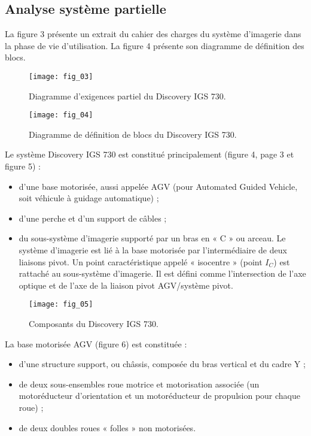 \subsection{Analyse système partielle}
La figure 3 présente un extrait du cahier des charges du système d’imagerie dans la phase de vie
d’utilisation. La figure 4 présente son diagramme de définition des blocs.


\begin{figure}[!h]
\centering
\texttt{[image: fig\_03]}
\caption{\label{fig:03}  Diagramme d’exigences partiel du Discovery IGS 730.}
\end{figure}


\begin{figure}[!h]
\centering
\texttt{[image: fig\_04]}
\caption{\label{fig:04}  Diagramme de définition de blocs du Discovery IGS 730.}
\end{figure}

Le système Discovery IGS 730 est constitué principalement (figure 4, page 3 et figure 5) :
\begin{itemize}
\item d’une base motorisée, aussi appelée AGV (pour Automated Guided Vehicle, soit véhicule à
guidage automatique) ;
\item d’une perche et d’un support de câbles ;
\item du sous-système d’imagerie supporté par un bras en « C » ou arceau. Le système d’imagerie
est lié à la base motorisée par l’intermédiaire de deux liaisons pivot. Un point caractéristique
appelé « isocentre » (point $I_C$) est rattaché au sous-système d’imagerie. Il est défini comme
l’intersection de l’axe optique et de l’axe de la liaison pivot AGV/système pivot.
\end{itemize}

\begin{figure}[!h]
\centering
\texttt{[image: fig\_05]}
\caption{\label{fig:05}  Composants du Discovery IGS 730.}
\end{figure}

La base motorisée AGV (figure 6) est constituée :
\begin{itemize}
\item d’une structure support, ou châssis, composée du bras vertical et du cadre Y ;
\item de deux sous-ensembles roue motrice et motorisation associée (un motoréducteur d’orientation et un motoréducteur de propulsion pour chaque roue) ;
\item de deux doubles roues « folles » non motorisées.
\end{itemize}

